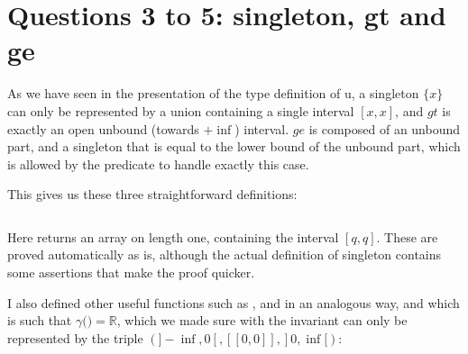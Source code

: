 \section{Questions 3 to 5: singleton, gt and ge}

As we have seen in the presentation of the type definition of u, a singleton $\{x\}$
can only be represented by a union containing a single interval $[x,x]$, and $gt$ is
exactly an open unbound (towards $+\inf$) interval.
%
$ge$ is composed of an unbound
part, and a singleton that is equal to the lower bound of the unbound part, which is
allowed by the  predicate to handle exactly this case.

This gives us these three straightforward definitions:
\inputminted{\whyml}{why3code/simple_ones.mlw}

Here  returns an array on length one, containing the
interval $[q,q]$. These are proved automatically as is, although the actual
definition of singleton contains some assertions that make the proof quicker.

I also defined other useful functions such as ,  and
 in an analogous way, and  which is such that
$\gamma($$) = \mathbb{R}$, which we made sure with the invariant can
only be represented by the triple $(]-\inf, 0[, [[0,0]], ]0,\inf[)$:
\inputminted{\whyml}{why3code/simple_all.mlw}
